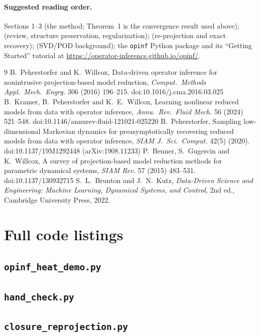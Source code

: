 \documentclass[11pt]{article}
\theoremstyle{remark}\newtheorem{remark}{Remark}
\begin{document}
\paragraph{Suggested reading order.} \cite{PW16} Sections 1--3 (the method; Theorem~1 is the convergence result used above); \cite{KPW24} (review, structure preservation, regularization); \cite{P20} (re-projection and exact recovery); \cite[Ch.~1 and the ROM chapter]{BK22} (SVD/POD background); the \texttt{opinf} Python package and its ``Getting Started'' tutorial at \url{https://operator-inference.github.io/opinf/}.

\begin{thebibliography}{9}
 B.~Peherstorfer and K.~Willcox, Data-driven operator inference for nonintrusive projection-based model reduction, \emph{Comput.\ Methods Appl.\ Mech.\ Engrg.} 306 (2016) 196--215. doi:10.1016/j.cma.2016.03.025
 B.~Kramer, B.~Peherstorfer and K.~E.~Willcox, Learning nonlinear reduced models from data with operator inference, \emph{Annu.\ Rev.\ Fluid Mech.} 56 (2024) 521--548. doi:10.1146/annurev-fluid-121021-025220
 B.~Peherstorfer, Sampling low-dimensional Markovian dynamics for preasymptotically recovering reduced models from data with operator inference, \emph{SIAM J.\ Sci.\ Comput.} 42(5) (2020). doi:10.1137/19M1292448 (arXiv:1908.11233)
 P.~Benner, S.~Gugercin and K.~Willcox, A survey of projection-based model reduction methods for parametric dynamical systems, \emph{SIAM Rev.} 57 (2015) 483--531. doi:10.1137/130932715
 S.~L.~Brunton and J.~N.~Kutz, \emph{Data-Driven Science and Engineering: Machine Learning, Dynamical Systems, and Control}, 2nd ed., Cambridge University Press, 2022.
\end{thebibliography}

\appendix
\section{Full code listings}\label{app:code}
\subsection*{\texttt{opinf\_heat\_demo.py}}

\subsection*{\texttt{hand\_check.py}}

\subsection*{\texttt{closure\_reprojection.py}}

\end{document}
